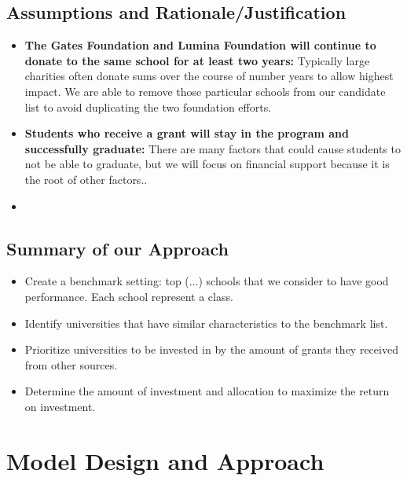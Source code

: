\documentclass[12pt]{scrartcl}
\begin{document}
	\subsection{Assumptions and Rationale/Justification}
	\begin{itemize}
		\item \textbf{The Gates Foundation and Lumina Foundation will continue to donate to the same school for at least two years:} Typically large charities often donate sums over the course of number years to allow highest impact. \cite{Conkey} We are able to remove those particular schools from our candidate list to avoid duplicating the two foundation efforts. 
				
		\item \textbf{Students who receive a grant will stay in the program and successfully graduate:} There are many factors that could cause students to not be able to graduate, but we will focus on financial support because it is the root of other factors..\cite{Trom}

		\item \textbf{} 
	\end{itemize}
	
	\subsection{Summary of our Approach}
		\begin{itemize}
		\item Create a benchmark setting: top (...) schools that we consider to have good performance. Each school represent a class.  
		\item Identify universities that have similar characteristics to the benchmark list. 
		\item Prioritize universities to be invested in by the amount of grants they received from other sources.
		\item Determine the amount of investment and allocation to maximize the return on investment. 
		\end{itemize}
				 
\clearpage
\section{Model Design and Approach}
\end{document}
